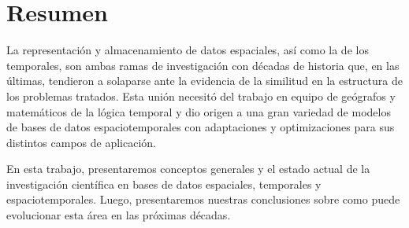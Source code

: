 \chapter{Resumen}

La representación y almacenamiento de datos espaciales, así como la de los temporales, son ambas ramas de investigación con décadas de historia que, en las últimas, tendieron a solaparse ante la evidencia de la similitud en la estructura de los problemas tratados. Esta unión necesitó del trabajo en equipo de geógrafos y matemáticos de la lógica temporal y dio origen a una gran variedad de modelos de bases de datos espaciotemporales con adaptaciones y optimizaciones para sus distintos campos de aplicación.

En esta trabajo, presentaremos conceptos generales y el estado actual de la investigación científica en bases de datos espaciales, temporales y espaciotemporales. Luego, presentaremos nuestras conclusiones sobre como puede evolucionar esta área en las próximas décadas.